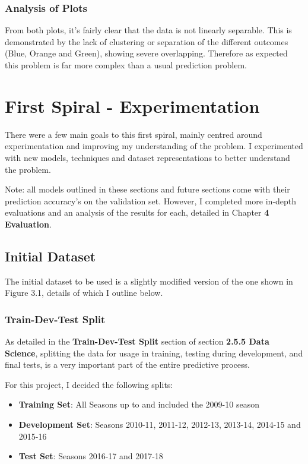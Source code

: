 \documentclass[12pt,a4paper,twoside,openright]{report}
\begin{document}
\subsubsection{Analysis of Plots}

From both plots, it's fairly clear that the data is not linearly separable. This is demonstrated by the lack of clustering or separation of the different outcomes (Blue, Orange and Green), showing severe overlapping. Therefore as expected this problem is far more complex than a usual prediction problem.

\section{First Spiral - Experimentation}

There were a few main goals to this first spiral, mainly centred around experimentation and improving my understanding of the problem. I experimented with new models, techniques and dataset representations to better understand the problem.

Note: all models outlined in these sections and future sections come with their prediction accuracy's on the validation set. However, I completed more in-depth evaluations and an analysis of the results for each, detailed in Chapter \textbf{4 Evaluation}.

\subsection{Initial Dataset}

The initial dataset to be used is a slightly modified version of the one shown in Figure 3.1, details of which I outline below.

\subsubsection{Train-Dev-Test Split}

As detailed in the \textbf{Train-Dev-Test Split} section of section \textbf{2.5.5 Data Science}, splitting the data for usage in training, testing during development, and final tests, is a very important part of the entire predictive process.

For this project, I decided the following splits:
\begin{itemize}
    \item
    {
    \textbf{Training Set}: All Seasons up to and included the 2009-10 season
    }
    \item
    {
    \textbf{Development Set}: Seasons 2010-11, 2011-12, 2012-13, 2013-14, 2014-15 and 2015-16
    }
    \item 
    {
    \textbf{Test Set}: Seasons 2016-17 and 2017-18 
    }
\end{itemize}
\end{document}
